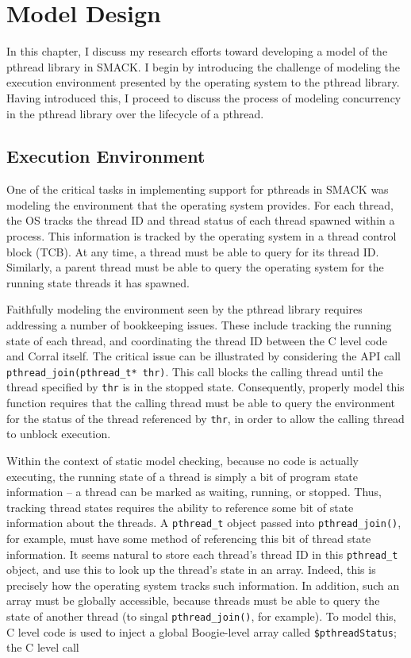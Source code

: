 \chapter{Model Design}\label{ch:modeldesign}
In this chapter, I discuss my research efforts toward developing a
model of the pthread library in SMACK.  I begin by introducing the
challenge of modeling the execution environment presented by the
operating system to the pthread library.  Having introduced this, I
proceed to discuss the process of modeling concurrency in the pthread
library over the lifecycle of a pthread.

\section{Execution Environment}
One of the critical tasks in implementing support for pthreads in
SMACK was modeling the environment that the operating system provides.
For each thread, the OS tracks the thread ID and thread status of
each thread spawned within a process.  This information is tracked by
the operating system in a thread control block (TCB).  At any time, a
thread must be able to query for its thread ID.  Similarly, a 
parent thread must be able to query the operating system for the
running state threads it has spawned.

Faithfully modeling the environment seen by the pthread library
requires addressing a number of bookkeeping issues.  These include
tracking the running state of each thread, and coordinating the thread
ID between the C level code and Corral itself.  The critical issue can
be illustrated by considering the API call
\lstinline|pthread_join(pthread_t* thr)|. This call blocks the calling
thread until the thread specified by \lstinline|thr| is in the stopped
state.  Consequently, properly model this function requires that the
calling thread must be able to query the environment for the status of
the thread referenced by \lstinline|thr|, in order to allow the
calling thread to unblock execution. 

Within the context of static model checking, because no code is
actually executing, the running state of a thread is simply a bit of
program state information -- a thread can be marked as waiting,
running, or stopped. Thus, tracking thread states requires the ability
to reference some bit of state information about the threads. A
\lstinline|pthread_t| object passed into \lstinline|pthread_join()|,
for example, must have some method of referencing this bit of thread
state information.  It seems natural to store each thread's thread ID
in this \lstinline|pthread_t| object, and use this to look up the
thread's state in an array.  Indeed, this is precisely how the
operating system tracks such information.  In addition, such an array
must be globally accessible, because threads must be able to query the
state of another thread (to singal \lstinline|pthread_join()|, for
example).  To model this, C level code is used to inject a global
Boogie-level array called \lstinline|$pthreadStatus|; the C level call

